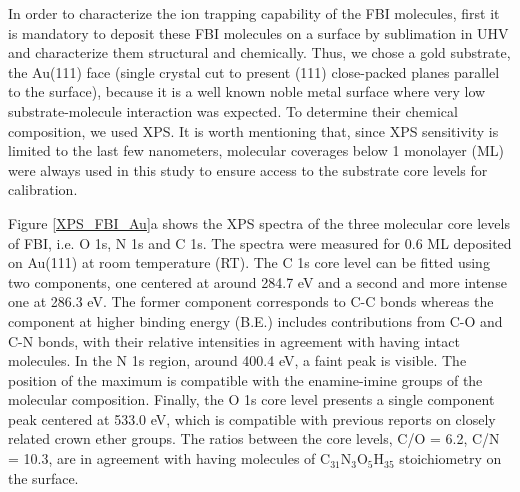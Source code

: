 \documentclass[aps,prl,reprint,longbibliography,superscriptaddress, english]{revtex4-1}
\begin{document}
In order to characterize the ion trapping capability of the FBI molecules, first it is mandatory to deposit these FBI molecules on a surface by sublimation in UHV and characterize them structural and chemically. Thus, we chose a gold substrate, the Au(111) face (single crystal cut to present (111) close-packed planes parallel to the surface), because it is a well known noble metal surface where very low substrate-molecule interaction was expected. To determine their chemical composition, we used XPS. It is worth mentioning that, since XPS sensitivity is limited to the last few nanometers, molecular coverages below 1 monolayer (ML) were always used in this study to ensure access to the substrate core levels for calibration. 

Figure {\ref{XPS_FBI_Au}}a shows the XPS spectra of the three molecular core levels of FBI, i.e. O 1s, N 1s and C 1s. The spectra were measured for 0.6 ML deposited on Au(111) at room temperature (RT). The C 1s core level can be fitted using two components, one {centered} at around 284.7 eV and a second and more intense one at 286.3 eV. The former component corresponds to C-C bonds whereas the component at higher binding energy (B.E.) includes contributions from C-O and C-N bonds, with their relative intensities in agreement with having intact molecules. In the N 1s region, around 400.4 eV, a faint peak is visible. The position of the maximum is compatible with the {enamine-imine} groups of the molecular composition. Finally, the O 1s core level presents a single component peak centered at 533.0 eV, which is compatible with previous reports on closely related crown ether groups\cite{stredansky_-surface_2019}. The ratios between the core levels, C/O = 6.2, C/N = 10.3, are in agreement with having molecules of $ \mathrm{C_{31}N_{3}O_{5}H_{35}}$ stoichiometry on the surface. 
\end{document}
